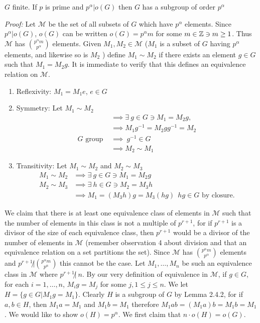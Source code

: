 \begin{theorem}
$G$ finite. If $p$ is prime and $p^\alpha|o(G)$ then $G$ has a subgroup of order $p^\alpha$
\steezybreak

\noindent \textit{Proof:}
Let $\mathcal{M}$ be the set of all subsets of $G$ which have $p^\alpha$ elements. Since
$p^\alpha | o(G)$, $o(G)$ can be written $o(G)=p^\alpha m$ for some $m\in {\mathbb{Z}} \ni m \geq 1$. Thus
$\mathcal{M}$ has ${p^\alpha m \choose p^\alpha}$ elements. Given $M_1 , M_2 \in \mathcal{M}$ ($M_1$
is a subset of $G$ having $p^\alpha$ elements, and likewise so is $M_2$ ) define $M_1 \sim M_2$ if
there exists an element $g \in G$ such that $M_1 = M_2g$. It is immediate to verify that this
defines an equivalence relation on $\mathcal{M}$.
\begin{enumerate}[label=\roman*)]
    \item Reflexivity: $M_1=M_1e$, $e\in G$
    \item Symmetry: Let $M_1\sim M_2 $
    \begin{align}
        &\implies \exists \ g\in G \ni M_1=M_2g, \nonumber \\
        &\implies M_1g^{-1} = M_2gg^{-1}=M_2 \nonumber \\
        G \text{ group } &\implies \ g^{-1}\in G \nonumber \\
        &\implies M_2\sim M_1 \nonumber
    \end{align}
    \item Transitivity: Let $M_1\sim M_2$ and $M_2\sim M_3$
    \begin{align}
        M_1\sim M_2 &\implies \exists \ g \in G \ni M_1= M_2g \nonumber \\
        M_2\sim M_3 &\implies \exists \ h \in G \ni M_2= M_3h \nonumber \\
        &\implies M_1 = (M_3h)g = M_3(hg) \ \  hg\in G \text{ by closure.} \nonumber
    \end{align}
\end{enumerate}


We claim that there is at least one equivalence class of elements in $\mathcal{M}$ such that the
number of elements in this class is not a multiple of $p^{r+1}$, for if $p^{r+1}$ is a divisor of
the size of each equivalence class, then $p^{r+1}$ would be a divisor of the number of elements in
$\mathcal{M}$ (remember observation 4 about division and that an equivalence relation on a set
partitions the set). Since $\mathcal{M}$ has ${p^\alpha m \choose p^\alpha}$ elements and
$p^{r+1} \not | {p^\alpha m \choose p^\alpha}$ this cannot be the case. Let ${M_1, \dots , M_n}$ be
such an equivalence class in $\mathcal{M}$ where $p^{r+1}\not | \ n $. By our very definition of
equivalence in $\mathcal{M}$, if $g \in G$, for each $i = 1, \dots , n$, $M_ig = M_j$ for some
$j, 1 \leq j \leq n$. We let $H = \{g \in G | M_1g = M_1 \}$. Clearly $H$ is a subgroup of $G$ by
Lemma 2.4.2, for if $a, b \in H$, then $M_1a = M_1 $ and $ M_1 b = M_1$ therefore
$M_1ab = (M_1a)b = M_1b =M_1$. We would like to show $o(H)=p^\alpha$. We first claim that
$n\cdot o(H) =o(G)$. \steezybreak


\end{theorem}
